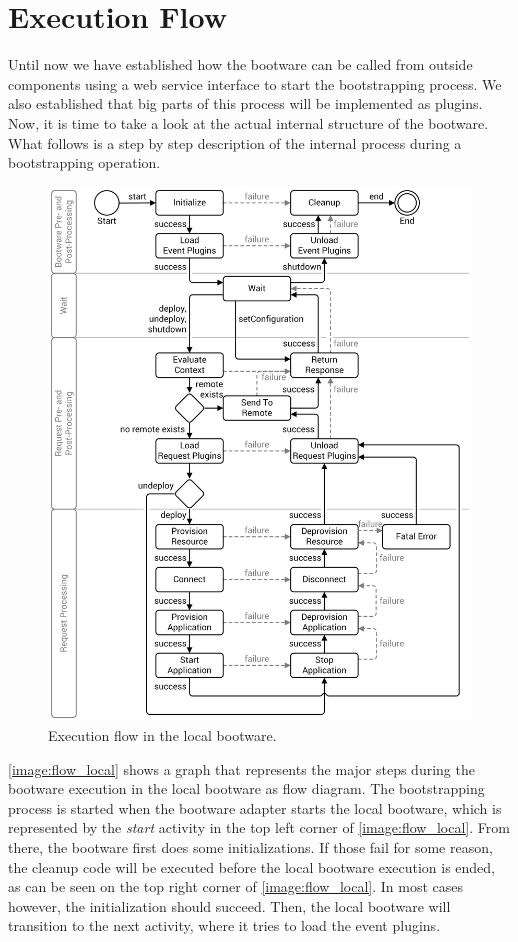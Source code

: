 \section{Execution Flow}
\label{design:flow}

Until now we have established how the bootware can be called from outside components using a web service interface to start the bootstrapping process.
We also established that big parts of this process will be implemented as plugins.
Now, it is time to take a look at the actual internal structure of the bootware.
What follows is a step by step description of the internal process during a bootstrapping operation.

\begin{figure}[!htbp]
	\centering
	\includegraphics[resolution=600]{design/assets/flow_local}
	\caption{Execution flow in the local bootware.}
	\label{image:flow_local}
\end{figure}

\autoref{image:flow_local} shows a graph that represents the major steps during the bootware execution in the local bootware as flow diagram.
The bootstrapping process is started when the bootware adapter starts the local bootware, which is represented by the \textit{start} activity in the top left corner of \autoref{image:flow_local}.
From there, the bootware first does some initializations.
If those fail for some reason, the cleanup code will be executed before the local bootware execution is ended, as can be seen on the top right corner of \autoref{image:flow_local}.
In most cases however, the initialization should succeed.
Then, the local bootware will transition to the next activity, where it tries to load the event plugins.

